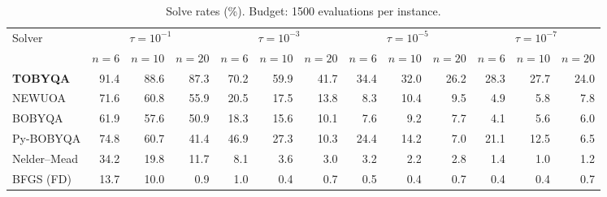 \begin{table}[t]
\centering\footnotesize
\setlength{\tabcolsep}{3pt}
\caption{Solve rates (\%). Budget: 1500 evaluations per instance.}
\label{tab:solve-rates}
\begin{tabular}{lrrrrrrrrrrrr}
\toprule
Solver & \multicolumn{3}{c}{$\tau=10^{-1}$} & \multicolumn{3}{c}{$\tau=10^{-3}$} & \multicolumn{3}{c}{$\tau=10^{-5}$} & \multicolumn{3}{c}{$\tau=10^{-7}$} \\
\cmidrule(lr){2-4}\cmidrule(lr){5-7}\cmidrule(lr){8-10}\cmidrule(lr){11-13}
 & $n{=}6$ & $n{=}10$ & $n{=}20$ & $n{=}6$ & $n{=}10$ & $n{=}20$ & $n{=}6$ & $n{=}10$ & $n{=}20$ & $n{=}6$ & $n{=}10$ & $n{=}20$ \\
\midrule
\textbf{TOBYQA} & 91.4 & 88.6 & 87.3 & 70.2 & 59.9 & 41.7 & 34.4 & 32.0 & 26.2 & 28.3 & 27.7 & 24.0 \\
NEWUOA & 71.6 & 60.8 & 55.9 & 20.5 & 17.5 & 13.8 & 8.3 & 10.4 & 9.5 & 4.9 & 5.8 & 7.8 \\
BOBYQA & 61.9 & 57.6 & 50.9 & 18.3 & 15.6 & 10.1 & 7.6 & 9.2 & 7.7 & 4.1 & 5.6 & 6.0 \\
Py-BOBYQA & 74.8 & 60.7 & 41.4 & 46.9 & 27.3 & 10.3 & 24.4 & 14.2 & 7.0 & 21.1 & 12.5 & 6.5 \\
Nelder--Mead & 34.2 & 19.8 & 11.7 & 8.1 & 3.6 & 3.0 & 3.2 & 2.2 & 2.8 & 1.4 & 1.0 & 1.2 \\
BFGS (FD) & 13.7 & 10.0 & 0.9 & 1.0 & 0.4 & 0.7 & 0.5 & 0.4 & 0.7 & 0.4 & 0.4 & 0.7 \\
\bottomrule
\end{tabular}
\end{table}